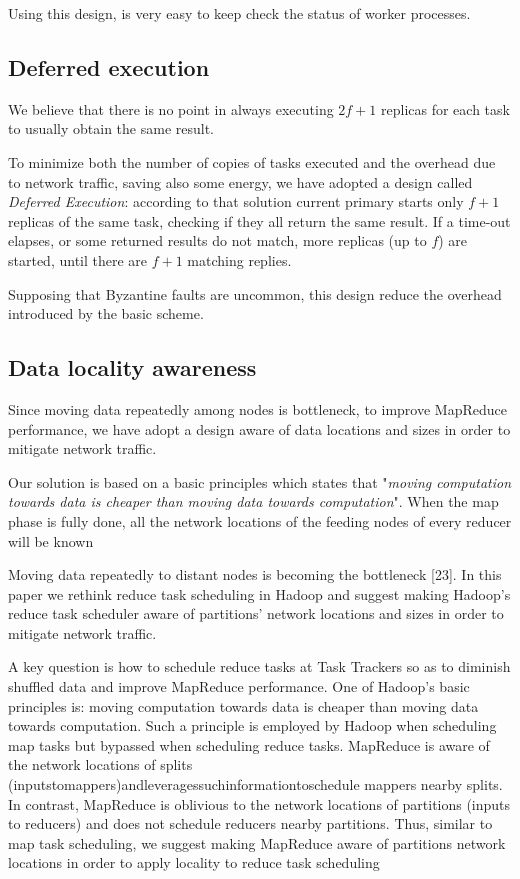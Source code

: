 \documentclass[sigchi]{acmart}
\begin{document}
Using this design, is very easy to keep check the status of worker processes.

\subsection{Deferred execution} We believe that there is no point in always executing $2f + 1$ replicas for each task to usually obtain the same result. 

To minimize both the number of copies of tasks executed and the overhead due to network traffic, saving also some energy, we have adopted a design called \textit{Deferred Execution}: according to that solution current primary starts only $f + 1$ replicas of the same task, checking if they all return the same result. If a time-out elapses, or some returned results do not match, more replicas (up to $f$) are started, until there are $f + 1$ matching replies. 

Supposing that Byzantine faults are uncommon, this design reduce the overhead introduced by the basic scheme.

\subsection{Data locality awareness}

Since moving data repeatedly among nodes is bottleneck, to improve MapReduce performance, we have adopt a design aware of data locations and sizes in order to mitigate network traffic.

Our solution is based on a basic principles which states that "\textit{moving computation towards data is cheaper than moving data towards computation}". When the map phase is fully done, all the network locations of the feeding nodes of every reducer will be known


Moving data repeatedly to distant nodes is becoming the bottleneck [23]. In this paper we rethink reduce task scheduling in Hadoop and suggest making Hadoop’s reduce task scheduler aware of partitions’ network locations and sizes in order to mitigate network traffic. 

A key question is how to schedule reduce tasks at Task Trackers so as to diminish shuffled data and improve MapReduce performance. One of Hadoop’s basic principles is: moving computation towards data is cheaper than moving data towards computation. Such a principle is employed by Hadoop when scheduling map tasks but bypassed when scheduling reduce tasks. MapReduce is aware of the network locations of splits (inputstomappers)andleveragessuchinformationtoschedule mappers nearby splits. In contrast, MapReduce is oblivious to the network locations of partitions (inputs to reducers) and does not schedule reducers nearby partitions. Thus, similar to map task scheduling, we suggest making MapReduce aware of partitions network locations in order to apply locality to reduce task scheduling
\end{document}
